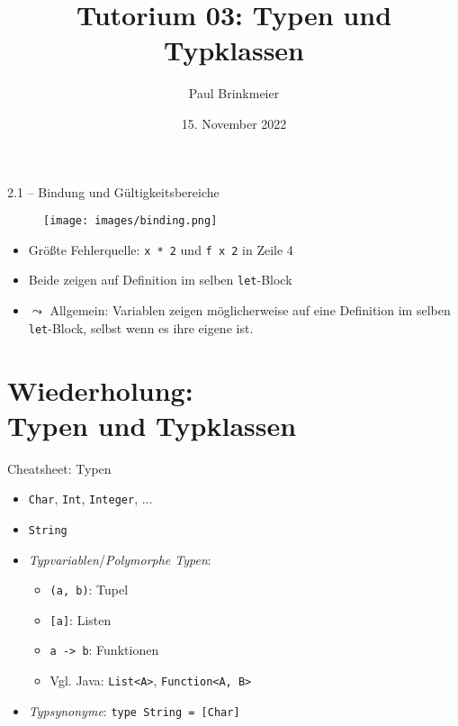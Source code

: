\documentclass{beamer}
\title{Tutorium 03: Typen und Typklassen}
\author{Paul Brinkmeier}
\institute{Tutorium Programmierparadigmen am KIT}
\date{15. November 2022}
\begin{document}
\begin{frame}
	\titlepage
\end{frame}

\begin{frame}{2.1 -- Bindung und Gültigkeitsbereiche}
    \begin{figure}
        \texttt{[image: images/binding.png]}
    \end{figure}

    \begin{itemize}
        \item Größte Fehlerquelle: \texttt{x * 2} und \texttt{f x 2} in Zeile 4
        \item Beide zeigen auf Definition im selben \texttt{let}-Block
        \item $\leadsto$ Allgemein: Variablen zeigen möglicherweise auf eine Definition im selben \texttt{let}-Block, selbst wenn es ihre eigene ist.
    \end{itemize}
\end{frame}

\section{Wiederholung:\\Typen und Typklassen}

\begin{frame}{Cheatsheet: Typen}
  \begin{itemize}
    \item \texttt{Char}, \texttt{Int}, \texttt{Integer}, ...
    \item \texttt{String}
    \item \emph{Typvariablen}/\emph{Polymorphe Typen}:
    \begin{itemize}
      \item \texttt{(a, b)}: Tupel
      \item \texttt{[a]}: Listen
      \item \texttt{a -> b}: Funktionen
      \item Vgl. Java: \texttt{List<A>}, \texttt{Function<A, B>}
    \end{itemize}
    \item \emph{Typsynonyme}: \texttt{type String = [Char]}
  \end{itemize}
\end{frame}
\end{document}
